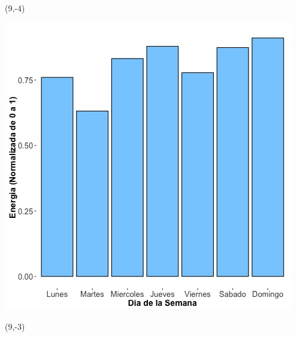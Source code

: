 \documentclass{article}\usepackage[]{graphicx}\usepackage[]{color}
\newenvironment{knitrout}{}{} %
\begin{document}
 \begin{textblock}{1}(9,-4)
\begin{minipage}{20em}
\begingroup

\endgroup
\end{minipage}
\end{textblock}


\begin{knitrout}
\color{fgcolor}
\includegraphics[scale=0.65]{figure/A26_day_of_week_plot} 
\end{knitrout}


 \begin{textblock}{1}(9,-3)
\begin{minipage}{20em}
\begingroup

\endgroup
\end{minipage}
\end{textblock}

 \vspace{2cm}
\end{document}
